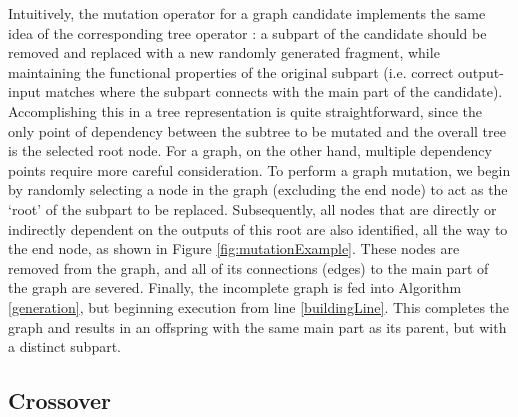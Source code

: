 \documentclass{article}
\begin{document}
Intuitively, the mutation operator for a graph candidate implements the same idea of the corresponding tree
operator \cite{aversano2006genetic}: a subpart of the candidate should be removed and replaced with a new randomly generated fragment,
while maintaining the functional properties of the original subpart (i.e. correct output-input matches where
the subpart connects with the main part of the candidate). Accomplishing this in a tree representation is quite straightforward, since the
only point of dependency between the subtree to be mutated and the overall tree is the selected root node. For a graph, on the other hand,
multiple dependency points require more careful consideration. To perform a graph mutation, we begin by randomly selecting a node in the
graph (excluding the end node) to act as the `root' of the subpart to be replaced. Subsequently, all nodes that
are directly or indirectly dependent on the outputs of this root are also identified, all the way to the end node,
as shown in Figure \ref{fig:mutationExample}. These nodes are removed from the graph, and all of its connections (edges) to the main
part of the graph are severed. Finally, the incomplete graph is fed into Algorithm \ref{generation}, but beginning
execution from line \ref{buildingLine}. This completes the graph and results in an offspring with the same main
part as its parent, but with a distinct subpart.

\subsection{Crossover}
\end{document}
